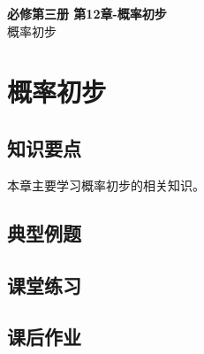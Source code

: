 \documentclass[12pt,a4paper]{article}
\begin{document}
\begin{center}
\LARGE\textbf{必修第三册 第12章-概率初步} \\[0.5em]
\large 概率初步
\end{center}

\tableofcontents
\newpage

\section{概率初步}

\subsection{知识要点}
本章主要学习概率初步的相关知识。

\subsection{典型例题}

\subsection{课堂练习}

\subsection{课后作业}
\end{document}
